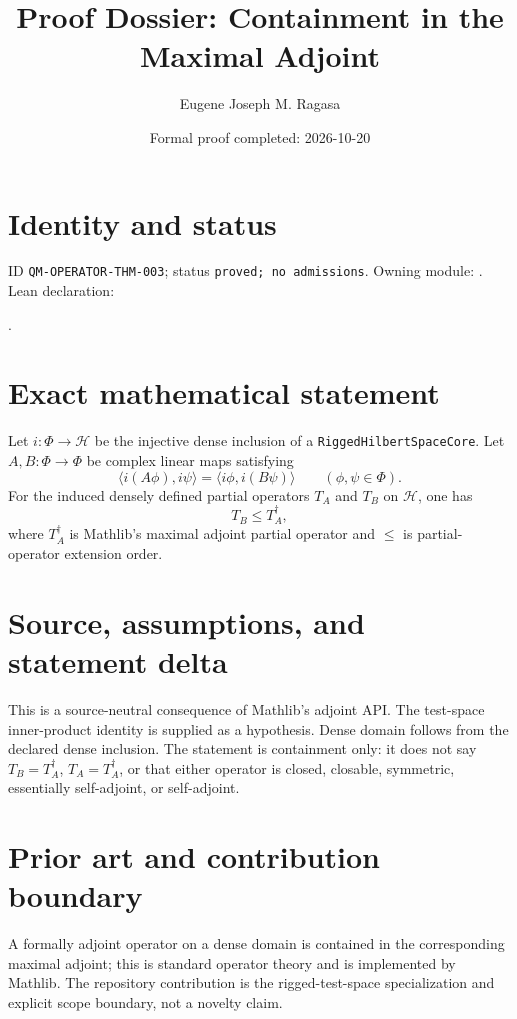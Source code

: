 \documentclass[11pt]{article}
\title{Proof Dossier: Containment in the Maximal Adjoint}
\author{Eugene Joseph M. Ragasa}
\date{Formal proof completed: 2026-10-20}
\begin{document}
\maketitle

\section{Identity and status}
ID \texttt{QM-OPERATOR-THM-003}; status \texttt{proved; no admissions}.
Owning module: .
Lean declaration:
\par{}.

\section{Exact mathematical statement}
Let $i:\Phi\to\mathcal H$ be the injective dense inclusion of a
\texttt{RiggedHilbertSpaceCore}. Let $A,B:\Phi\to\Phi$ be complex linear maps satisfying
\[
  \langle i(A\phi),i\psi\rangle
  =\langle i\phi,i(B\psi)\rangle
  \qquad(\phi,\psi\in\Phi).
\]
For the induced densely defined partial operators $T_A$ and $T_B$ on $\mathcal H$, one has
\[
  T_B\leq T_A^{\dagger},
\]
where $T_A^{\dagger}$ is Mathlib's maximal adjoint partial operator and $\leq$ is partial-operator
extension order.

\section{Source, assumptions, and statement delta}
This is a source-neutral consequence of Mathlib's adjoint API. The test-space inner-product
identity is supplied as a hypothesis. Dense domain follows from the declared dense inclusion. The
statement is containment only: it does not say $T_B=T_A^{\dagger}$, $T_A=T_A^{\dagger}$, or that
either operator is closed, closable, symmetric, essentially self-adjoint, or self-adjoint.

\section{Prior art and contribution boundary}
A formally adjoint operator on a dense domain is contained in the corresponding maximal adjoint;
this is standard operator theory and is implemented by Mathlib. The repository contribution is the
rigged-test-space specialization and explicit scope boundary, not a novelty claim.
\end{document}
